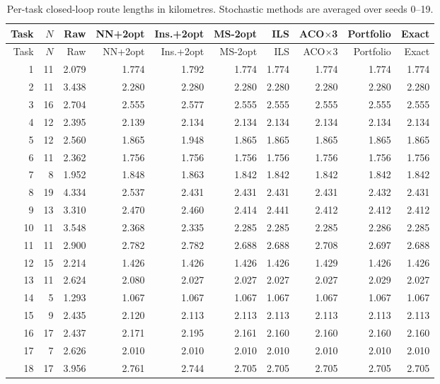 \begin{longtable}{rrrrrrrrrr}
\caption{Per-task closed-loop route lengths in kilometres. Stochastic methods are averaged over seeds 0--19.}\label{tab:per_task}\\
\toprule
Task & $N$ & Raw & NN+2opt & Ins.+2opt & MS-2opt & ILS & ACO$\times$3 & Portfolio & Exact \\
\midrule\endfirsthead
\toprule Task & $N$ & Raw & NN+2opt & Ins.+2opt & MS-2opt & ILS & ACO$\times$3 & Portfolio & Exact \\
\midrule\endhead
1 & 11 & 2.079 & 1.774 & 1.792 & 1.774 & 1.774 & 1.774 & 1.774 & 1.774 \\ 
2 & 11 & 3.438 & 2.280 & 2.280 & 2.280 & 2.280 & 2.280 & 2.280 & 2.280 \\ 
3 & 16 & 2.704 & 2.555 & 2.577 & 2.555 & 2.555 & 2.555 & 2.555 & 2.555 \\ 
4 & 12 & 2.395 & 2.139 & 2.134 & 2.134 & 2.134 & 2.134 & 2.134 & 2.134 \\ 
5 & 12 & 2.560 & 1.865 & 1.948 & 1.865 & 1.865 & 1.865 & 1.865 & 1.865 \\ 
6 & 11 & 2.362 & 1.756 & 1.756 & 1.756 & 1.756 & 1.756 & 1.756 & 1.756 \\ 
7 & 8 & 1.952 & 1.848 & 1.863 & 1.842 & 1.842 & 1.842 & 1.842 & 1.842 \\ 
8 & 19 & 4.334 & 2.537 & 2.431 & 2.431 & 2.431 & 2.431 & 2.432 & 2.431 \\ 
9 & 13 & 3.310 & 2.470 & 2.460 & 2.414 & 2.441 & 2.412 & 2.412 & 2.412 \\ 
10 & 11 & 3.548 & 2.368 & 2.335 & 2.285 & 2.285 & 2.285 & 2.286 & 2.285 \\ 
11 & 11 & 2.900 & 2.782 & 2.782 & 2.688 & 2.688 & 2.708 & 2.697 & 2.688 \\ 
12 & 15 & 2.214 & 1.426 & 1.426 & 1.426 & 1.426 & 1.429 & 1.426 & 1.426 \\ 
13 & 11 & 2.624 & 2.080 & 2.027 & 2.027 & 2.027 & 2.027 & 2.029 & 2.027 \\ 
14 & 5 & 1.293 & 1.067 & 1.067 & 1.067 & 1.067 & 1.067 & 1.067 & 1.067 \\ 
15 & 9 & 2.435 & 2.120 & 2.113 & 2.113 & 2.113 & 2.113 & 2.113 & 2.113 \\ 
16 & 17 & 2.437 & 2.171 & 2.195 & 2.161 & 2.160 & 2.160 & 2.160 & 2.160 \\ 
17 & 7 & 2.626 & 2.010 & 2.010 & 2.010 & 2.010 & 2.010 & 2.010 & 2.010 \\ 
18 & 17 & 3.956 & 2.761 & 2.744 & 2.705 & 2.705 & 2.705 & 2.705 & 2.705 \\ 

\end{longtable}
